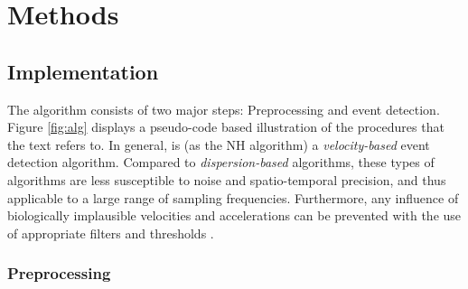 

\section*{Methods}\label{methods}


\subsection*{\remodnav Implementation}\label{impl}


The algorithm consists of two major steps: Preprocessing and event detection. Figure \ref{fig:alg} displays a
pseudo-code based illustration of the procedures that the text refers to. In general, \remodnav is (as the
NH algorithm) a \textit{velocity-based} event detection algorithm. Compared to \textit{dispersion-based}
algorithms, these types of algorithms are less susceptible to noise and spatio-temporal precision, and thus
applicable to a large range of sampling frequencies. Furthermore, any influence of biologically implausible
velocities and accelerations can be prevented with the use of appropriate filters and thresholds
\citep{holmqvist2011eye}.

\subsubsection*{Preprocessing}


